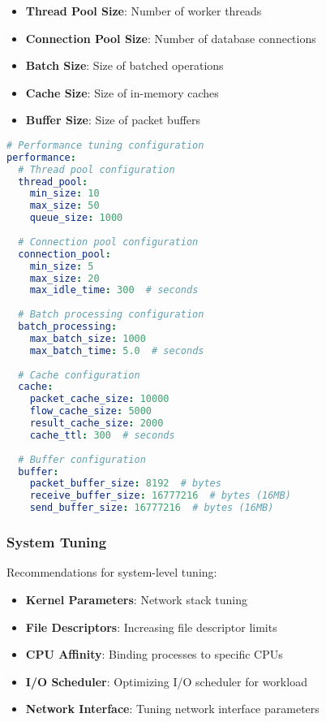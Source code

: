 \begin{itemize}
    \item \textbf{Thread Pool Size}: Number of worker threads
    \item \textbf{Connection Pool Size}: Number of database connections
    \item \textbf{Batch Size}: Size of batched operations
    \item \textbf{Cache Size}: Size of in-memory caches
    \item \textbf{Buffer Size}: Size of packet buffers
\end{itemize}

\begin{lstlisting}[language=yaml, caption=Performance Tuning Configuration]
# Performance tuning configuration
performance:
  # Thread pool configuration
  thread_pool:
    min_size: 10
    max_size: 50
    queue_size: 1000
    
  # Connection pool configuration
  connection_pool:
    min_size: 5
    max_size: 20
    max_idle_time: 300  # seconds
    
  # Batch processing configuration
  batch_processing:
    max_batch_size: 1000
    max_batch_time: 5.0  # seconds
    
  # Cache configuration
  cache:
    packet_cache_size: 10000
    flow_cache_size: 5000
    result_cache_size: 2000
    cache_ttl: 300  # seconds
    
  # Buffer configuration
  buffer:
    packet_buffer_size: 8192  # bytes
    receive_buffer_size: 16777216  # bytes (16MB)
    send_buffer_size: 16777216  # bytes (16MB)
\end{lstlisting}

\subsubsection{System Tuning}
Recommendations for system-level tuning:

\begin{itemize}
    \item \textbf{Kernel Parameters}: Network stack tuning
    \item \textbf{File Descriptors}: Increasing file descriptor limits
    \item \textbf{CPU Affinity}: Binding processes to specific CPUs
    \item \textbf{I/O Scheduler}: Optimizing I/O scheduler for workload
    \item \textbf{Network Interface}: Tuning network interface parameters
\end{itemize}


